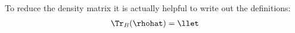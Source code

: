 To reduce the density matrix it is actually helpful to write out the definitions:
\begin{align}
\Tr_B(\rhohat) = \llet
\end{align}
